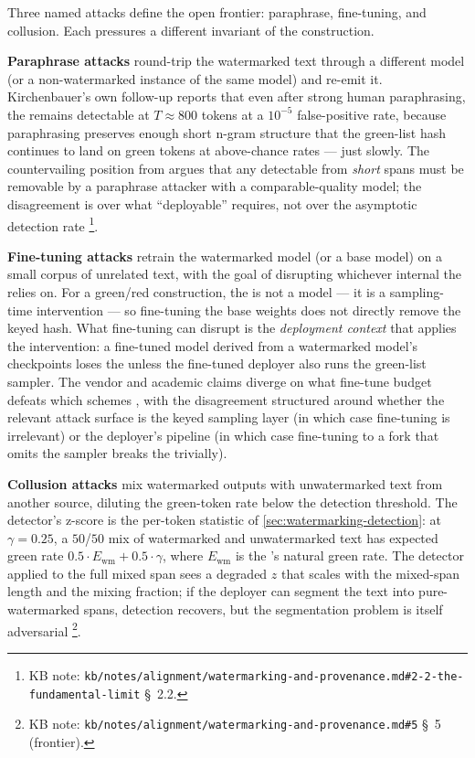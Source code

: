 Three named attacks define the open frontier: paraphrase, fine-tuning,
and collusion. Each pressures a different invariant of the construction.

\textbf{Paraphrase attacks} round-trip the watermarked text through a
different model (or a non-watermarked instance of the same model) and
re-emit it. Kirchenbauer's own follow-up
reports that even after strong human paraphrasing, the 
remains detectable at $T \approx 800$ tokens at a $10^{-5}$
false-positive rate, because paraphrasing preserves enough short
n-gram structure that the green-list hash continues to land on green
tokens at above-chance rates --- just slowly. The countervailing
position from \citet{sadasivan2023-detection}
argues that any  detectable from \emph{short} spans must be
removable by a paraphrase attacker with a comparable-quality model;
the disagreement is over what ``deployable'' requires, not over the
asymptotic detection rate%
\footnote{KB note: \texttt{kb/notes/alignment/watermarking-and-provenance.md\#2-2-the-fundamental-limit}
\S~2.2.}.

\textbf{Fine-tuning attacks} retrain the watermarked model (or a base
model) on a small corpus of unrelated text, with the goal of disrupting
whichever internal  the  relies on. For a green/red
construction, the  is not a model  --- it is a
sampling-time intervention --- so fine-tuning the base weights does
not directly remove the keyed hash. What fine-tuning can disrupt is
the \emph{deployment context} that applies the intervention: a
fine-tuned model derived from a watermarked model's checkpoints loses
the  unless the fine-tuned deployer also runs the
green-list sampler. The vendor and academic claims diverge on what
fine-tune budget defeats which schemes
, with the
disagreement structured around whether the relevant attack surface is
the keyed sampling layer (in which case fine-tuning is irrelevant) or
the deployer's pipeline (in which case fine-tuning to a fork that
omits the sampler breaks the  trivially).

\textbf{Collusion attacks} mix watermarked outputs with unwatermarked
text from another source, diluting the green-token rate below the
detection threshold. The detector's z-score is the per-token statistic
of \cref{sec:watermarking-detection}: at $\gamma = 0.25$, a $50$/$50$
mix of watermarked and unwatermarked text has expected green rate
$0.5 \cdot E_{\mathrm{wm}} + 0.5 \cdot \gamma$, where $E_{\mathrm{wm}}$
is the 's natural green rate. The detector applied to the
full mixed span sees a degraded $z$ that scales with the mixed-span
length and the mixing fraction; if the deployer can segment the text
into pure-watermarked spans, detection recovers, but the segmentation
problem is itself adversarial%
\footnote{KB note: \texttt{kb/notes/alignment/watermarking-and-provenance.md\#5}
\S~5 (frontier).}.

